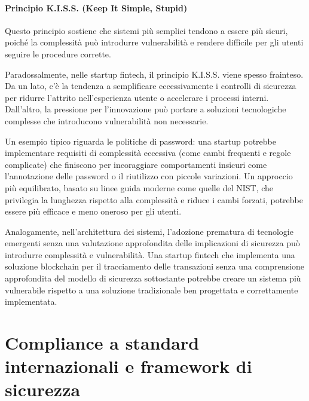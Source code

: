 \documentclass[a4paper,12pt]{report}
\begin{document}
\subsubsection{Principio K.I.S.S. (Keep It Simple, Stupid)}

Questo principio sostiene che sistemi più semplici tendono a essere più sicuri, poiché la complessità può introdurre vulnerabilità e rendere difficile per gli utenti seguire le procedure corrette.

Paradossalmente, nelle startup fintech, il principio K.I.S.S. viene spesso frainteso. Da un lato, c'è la tendenza a semplificare eccessivamente i controlli di sicurezza per ridurre l'attrito nell'esperienza utente o accelerare i processi interni. Dall'altro, la pressione per l'innovazione può portare a soluzioni tecnologiche complesse che introducono vulnerabilità non necessarie.

Un esempio tipico riguarda le politiche di password: una startup potrebbe implementare requisiti di complessità eccessiva (come cambi frequenti e regole complicate) che finiscono per incoraggiare comportamenti insicuri come l'annotazione delle password o il riutilizzo con piccole variazioni. Un approccio più equilibrato, basato su linee guida moderne come quelle del NIST, che privilegia la lunghezza rispetto alla complessità e riduce i cambi forzati, potrebbe essere più efficace e meno oneroso per gli utenti.

Analogamente, nell'architettura dei sistemi, l'adozione prematura di tecnologie emergenti senza una valutazione approfondita delle implicazioni di sicurezza può introdurre complessità e vulnerabilità. Una startup fintech che implementa una soluzione blockchain per il tracciamento delle transazioni senza una comprensione approfondita del modello di sicurezza sottostante potrebbe creare un sistema più vulnerabile rispetto a una soluzione tradizionale ben progettata e correttamente implementata.







\chapter{Compliance a standard internazionali e framework di sicurezza} 
\label{chapter:introduzione}
\end{document}
